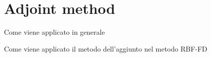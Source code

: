 



\section{Adjoint method}

Come viene applicato in generale


Come viene applicato il metodo dell'aggiunto nel metodo RBF-FD

























